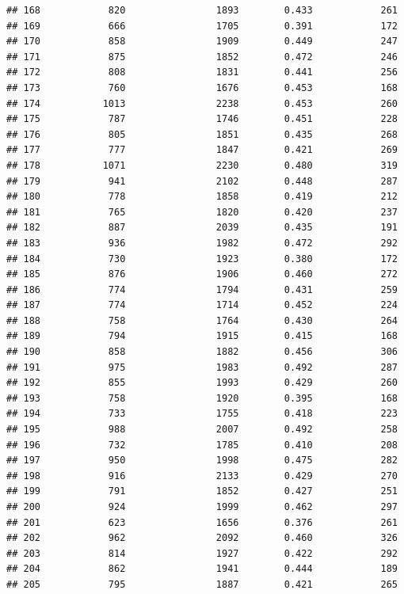 \documentclass[]{book}
\begin{document}
\begin{verbatim}
## 168            820                1893        0.433            261
## 169            666                1705        0.391            172
## 170            858                1909        0.449            247
## 171            875                1852        0.472            246
## 172            808                1831        0.441            256
## 173            760                1676        0.453            168
## 174           1013                2238        0.453            260
## 175            787                1746        0.451            228
## 176            805                1851        0.435            268
## 177            777                1847        0.421            269
## 178           1071                2230        0.480            319
## 179            941                2102        0.448            287
## 180            778                1858        0.419            212
## 181            765                1820        0.420            237
## 182            887                2039        0.435            191
## 183            936                1982        0.472            292
## 184            730                1923        0.380            172
## 185            876                1906        0.460            272
## 186            774                1794        0.431            259
## 187            774                1714        0.452            224
## 188            758                1764        0.430            264
## 189            794                1915        0.415            168
## 190            858                1882        0.456            306
## 191            975                1983        0.492            287
## 192            855                1993        0.429            260
## 193            758                1920        0.395            168
## 194            733                1755        0.418            223
## 195            988                2007        0.492            258
## 196            732                1785        0.410            208
## 197            950                1998        0.475            282
## 198            916                2133        0.429            270
## 199            791                1852        0.427            251
## 200            924                1999        0.462            297
## 201            623                1656        0.376            261
## 202            962                2092        0.460            326
## 203            814                1927        0.422            292
## 204            862                1941        0.444            189
## 205            795                1887        0.421            265

\end{verbatim}
\end{document}
